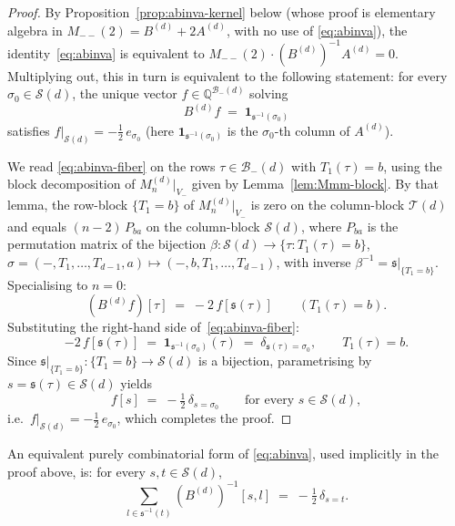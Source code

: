 \documentclass{amsart}
\theoremstyle{definition}
\theoremstyle{remark}
\newcommand{\Q}{\mathbb{Q}}
\begin{document}
\begin{proof}
By Proposition~\ref{prop:abinva-kernel} below (whose proof is
elementary algebra in $M_{--}(2) = B^{(d)} + 2 A^{(d)}$, with
no use of \eqref{eq:abinva}), the identity~\eqref{eq:abinva}
is equivalent to $M_{--}(2)\cdot (B^{(d)})^{-1} A^{(d)} = 0$.
Multiplying out, this in turn is equivalent to the following
statement: for every $\sigma_0 \in \mathcal{S}(d)$, the unique
vector $f \in \Q^{\mathcal{B}_-(d)}$ solving
\begin{equation}\label{eq:abinva-fiber}
  B^{(d)} f \;=\; \mathbf{1}_{\mathfrak{s}^{-1}(\sigma_0)}
\end{equation}
satisfies $f|_{\mathcal{S}(d)} = -\tfrac12\, e_{\sigma_0}$
(here $\mathbf{1}_{\mathfrak{s}^{-1}(\sigma_0)}$ is the
$\sigma_0$-th column of $A^{(d)}$).

We read \eqref{eq:abinva-fiber} on the rows
$\tau \in \mathcal{B}_-(d)$ with $T_1(\tau) = b$, using the
block decomposition of $M_n^{(d)}|_{V_-}$ given by
Lemma~\ref{lem:Mmm-block}.  By that lemma, the row-block
$\{T_1 = b\}$ of $M_n^{(d)}|_{V_-}$ is zero on the column-block
$\mathcal{T}(d)$ and equals $(n-2)\,P_{ba}$ on the column-block
$\mathcal{S}(d)$, where $P_{ba}$ is the permutation matrix of the
bijection $\beta : \mathcal{S}(d) \to \{\tau : T_1(\tau) = b\}$,
$\sigma = (-, T_1, \ldots, T_{d-1}, a) \mapsto
(-, b, T_1, \ldots, T_{d-1})$, with inverse
$\beta^{-1} = \mathfrak{s}|_{\{T_1 = b\}}$.  Specialising
to $n = 0$:
\begin{equation}\label{eq:Brow-T1b}
  (B^{(d)} f)[\tau] \;=\; -2\, f[\mathfrak{s}(\tau)]
  \qquad (T_1(\tau) = b).
\end{equation}
Substituting the right-hand side of~\eqref{eq:abinva-fiber}:
\[
  -2\, f[\mathfrak{s}(\tau)]
  \;=\; \mathbf{1}_{\mathfrak{s}^{-1}(\sigma_0)}(\tau)
  \;=\; \delta_{\mathfrak{s}(\tau) = \sigma_0},
  \qquad T_1(\tau) = b.
\]
Since $\mathfrak{s}|_{\{T_1 = b\}} : \{T_1 = b\} \to
\mathcal{S}(d)$ is a bijection, parametrising by
$s = \mathfrak{s}(\tau) \in \mathcal{S}(d)$ yields
\[
  f[s] \;=\; -\tfrac12\, \delta_{s = \sigma_0}
  \qquad \text{for every } s \in \mathcal{S}(d),
\]
i.e.\ $f|_{\mathcal{S}(d)} = -\tfrac12\, e_{\sigma_0}$, which
completes the proof.
\end{proof}

An equivalent purely combinatorial form of
\eqref{eq:abinva}, used implicitly in the proof above, is: for
every $s, t \in \mathcal{S}(d)$,
\begin{equation}\label{eq:abinva-comb}
  \sum_{l \in \mathfrak{s}^{-1}(t)} (B^{(d)})^{-1}[s, l]
  \;=\; -\tfrac12\,\delta_{s = t}.
\end{equation}
\end{document}

